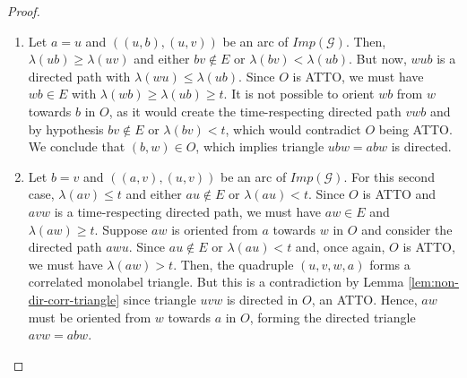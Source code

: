 \documentclass[runningheads]{llncs}
\begin{document}
\begin{proof}
\begin{figure}[H]
\begin{center}
\end{center}
\end{figure}

\begin{enumerate}[label=\roman*)]
 
\item Let $a=u$ and $((u,b),(u,v))$ be an arc of $Imp(\mathcal{G})$. Then, $\lambda(ub)\geq \lambda (uv)$ and either $bv\not\in E$ or $\lambda(bv)<\lambda(ub)$. But now, $wub$ is a directed path with $\lambda(wu) \leq \lambda(ub)$. Since $O$ is ATTO, we must have $wb\in E$ with $\lambda(wb)\geq \lambda(ub)\geq t$. It is not possible to orient $wb$ from $w$ towards $b$ in $O$, as it would create the time-respecting directed path $vwb$ and by hypothesis $bv\not\in E$ or $\lambda(bv)<t$, which would contradict $O$ being ATTO. We conclude that $(b,w)\in O$, which implies triangle $ubw = abw$ is directed.

\vspace{1ex}     
     
\item Let $b=v$ and $((a,v),(u,v))$ be an arc of $Imp(\mathcal{G})$. For this second case,  $\lambda(av)\leq t$ and either $au\not\in E$ or $\lambda(au)<t$. Since $O$ is ATTO and $avw$ is a time-respecting directed path, we must have $aw\in E$ and $\lambda(aw)\geq t$. Suppose $aw$ is oriented  from $a$ towards $w$ in $O$ and consider the directed path $awu$. Since $au\not\in E$ or $\lambda(au)<t$ and, once again, $O$ is ATTO, we must have $\lambda(aw)>t$. Then, the quadruple $(u,v,w,a)$ forms a correlated monolabel triangle. But this is a contradiction by Lemma \ref{lem:non-dir-corr-triangle} since triangle $uvw$ is directed in $O$, an ATTO. Hence, $aw$ must be oriented from $w$ towards $a$ in $O$, forming the directed triangle $avw = abw$.


\end{enumerate}
\end{proof}
\end{document}
